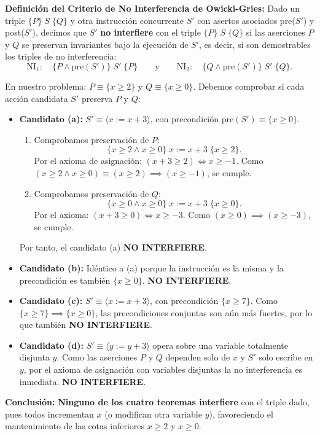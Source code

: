 \documentclass[11pt,a4paper,twoside,openright]{report}
\begin{document}
\begin{solucion}
\textbf{Definición del Criterio de No Interferencia de Owicki-Gries:}
Dado un triple $\{P\} \; S \; \{Q\}$ y otra instrucción concurrente $S'$ con asertos asociados pre($S'$) y post($S'$), decimos que $S'$ \textbf{no interfiere} con el triple $\{P\} \; S \; \{Q\}$ si las aserciones $P$ y $Q$ se preservan invariantes bajo la ejecución de $S'$, es decir, si son demostrables los triples de no interferencia:
\[
\text{NI}_1: \quad \{P \land \text{pre}(S')\} \; S' \; \{P\}
\qquad\text{y}\qquad
\text{NI}_2: \quad \{Q \land \text{pre}(S')\} \; S' \; \{Q\}.
\]

En nuestro problema: $P \equiv \{x \ge 2\}$ y $Q \equiv \{x \ge 0\}$. Debemos comprobar si cada acción candidata $S'$ preserva $P$ y $Q$:

\begin{itemize}[leftmargin=*]
    \item \textbf{Candidato (a):} $S' \equiv \langle x := x + 3 \rangle$, con precondición $\text{pre}(S') \equiv \{x \ge 0\}$.
    \begin{enumerate}
        \item Comprobamos preservación de $P$:
        \[
        \{x \ge 2 \land x \ge 0\} \; x := x + 3 \; \{x \ge 2\}.
        \]
        Por el axioma de asignación: $(x + 3 \ge 2) \iff x \ge -1$. Como $(x \ge 2 \land x \ge 0) \equiv (x \ge 2) \implies (x \ge -1)$, se cumple.
        \item Comprobamos preservación de $Q$:
        \[
        \{x \ge 0 \land x \ge 0\} \; x := x + 3 \; \{x \ge 0\}.
        \]
        Por el axioma: $(x + 3 \ge 0) \iff x \ge -3$. Como $(x \ge 0) \implies (x \ge -3)$, se cumple.
    \end{enumerate}
    Por tanto, el candidato (a) \textbf{NO INTERFIERE}.

    \item \textbf{Candidato (b):} Idéntico a (a) porque la instrucción es la misma y la precondición es también $\{x \ge 0\}$. \textbf{NO INTERFIERE}.

    \item \textbf{Candidato (c):} $S' \equiv \langle x := x + 3 \rangle$, con precondición $\{x \ge 7\}$.
    Como $\{x \ge 7\} \implies \{x \ge 0\}$, las precondiciones conjuntas son aún más fuertes, por lo que también \textbf{NO INTERFIERE}.

    \item \textbf{Candidato (d):} $S' \equiv \langle y := y + 3 \rangle$ opera sobre una variable totalmente disjunta $y$.
    Como las aserciones $P$ y $Q$ dependen solo de $x$ y $S'$ solo escribe en $y$, por el axioma de asignación con variables disjuntas la no interferencia es inmediata. \textbf{NO INTERFIERE}.
\end{itemize}

\textbf{Conclusión:} \textbf{Ninguno de los cuatro teoremas interfiere} con el triple dado, pues todos incrementan $x$ (o modifican otra variable $y$), favoreciendo el mantenimiento de las cotas inferiores $x \ge 2$ y $x \ge 0$.
\end{solucion}
\end{document}

